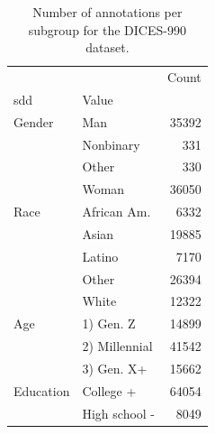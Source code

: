 \begin{table}[t]
\centering
\caption{Number of annotations per subgroup for the DICES-990 dataset.}
\label{tab:subgroups-dices-990}
\begin{tabular}{llr}
\toprule
 &  & Count \\
\ac{sdd} & Value &  \\
\midrule
Gender & Man & 35392 \\
 & Nonbinary & 331 \\
 & Other & 330 \\
 & Woman & 36050 \\
Race & African Am. & 6332 \\
 & Asian & 19885 \\
 & Latino & 7170 \\
 & Other & 26394 \\
 & White & 12322 \\
Age & 1) Gen. Z & 14899 \\
 & 2) Millennial & 41542 \\
 & 3) Gen. X+ & 15662 \\
Education & College + & 64054 \\
 & High school - & 8049 \\
\bottomrule
\end{tabular}
\end{table}
